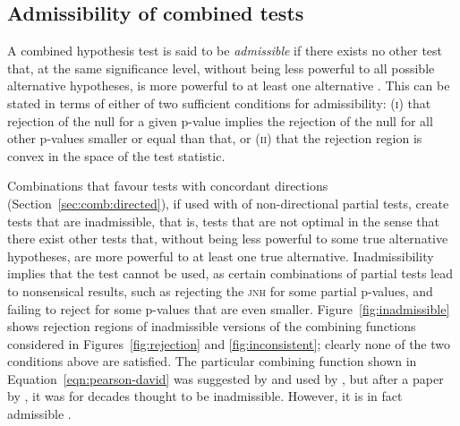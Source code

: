 \subsection{Admissibility of combined tests}
\label{sec:comb:admissibility}

A combined hypothesis test is said to be \emph{admissible} if there exists no other test that, at the same significance level, without being less powerful to all possible alternative hypotheses, is more powerful to at least one alternative \citep{Lehmann2005}. This can be stated in terms of either of two sufficient conditions for admissibility: (\textsc{i}) that rejection of the null for a given p-value implies the rejection of the null for all other p-values smaller or equal than that, or (\textsc{ii}) that the rejection region is convex in the space of the test statistic.

Combinations that favour tests with concordant directions (Section~\ref{sec:comb:directed}), if used with of non-directional partial tests, create tests that are inadmissible, that is, tests that are not optimal in the sense that there exist other tests that, without being less powerful to some true alternative hypotheses, are more powerful to at least one true alternative. Inadmissibility implies that the test cannot be used, as certain combinations of partial tests lead to nonsensical results, such as rejecting the \textsc{jnh} for some partial p-values, and failing to reject for some p-values that are even smaller. Figure~\ref{fig:inadmissible} shows rejection regions of inadmissible versions of the combining functions considered in Figures~\ref{fig:rejection} and \ref{fig:inconsistent}; clearly none of the two conditions above are satisfied. The particular combining function shown in Equation~\ref{eqn:pearson-david} was suggested by \citet{Pearson1933} and used by \citet{David1934}, but after a paper by \citet{Birnbaum1954}, it was for decades thought to be inadmissible. However, it is in fact admissible \citep{Owen2009}.

